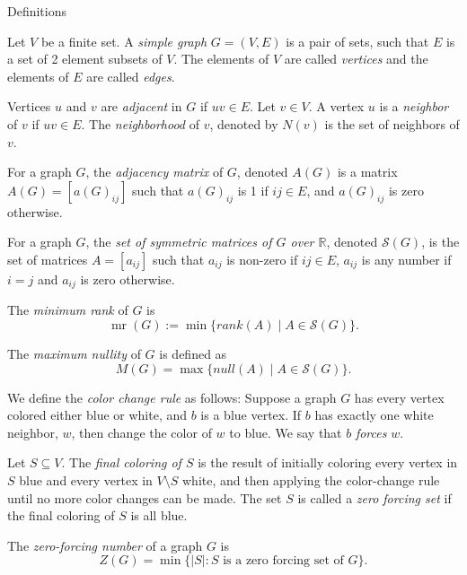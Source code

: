 \documentclass[final]{beamer}
\newcommand{\mr}{\operatorname{mr}}
\begin{document}
\begin{frame}{}
\begin{columns}[t]
\begin{column}{0.23\linewidth}
\begin{block}{Definitions}
\item Let $V$ be a finite set. A {\color{blue}\emph{simple graph}} $G=(V,E)$ is a pair of sets, such that $E$ is a set of 2 element subsets of $V$. The elements of $V$ are called {\color{blue}\emph{vertices}} and the elements of $E$ are called {\color{blue}\emph{edges}}. 
\item Vertices $u$ and $v$ are {\color{blue}\emph{adjacent}} in $G$ if $uv \in E$. Let $v \in V$. A vertex $u$ is a {\color{blue}\emph{neighbor}} of $v$ if $uv \in E$. The {\color{blue}\emph{neighborhood}} of $v$, denoted by $N(v)$ is the set of neighbors of $v$.
\item For a graph $G$, the {\color{blue}\emph{adjacency matrix}} of $G$, denoted $A(G)$ is a matrix $A(G) = [a(G)_{ij}]$ such that $a(G)_{ij}$ is 1 if $ij \in E$, and $a(G)_{ij}$ is zero otherwise. 
\item For a graph $G$, the {\color{blue}\emph{set of symmetric matrices of $G$ over $\mathbb{R}$}}, denoted $\mathcal{S}(G)$,  is the set of matrices $A=[a_{ij}]$ such that $a_{ij}$ is non-zero if $ij\in E$, $a_{ij}$ is any number if $i=j$ and $a_{ij}$ is zero otherwise. 
\item The {\color{blue}\emph{minimum rank}} of $G$ is 
\[
\mr(G) := \min\{rank(A) \mid A \in \mathcal{S}(G)\}.
\]
\item The {\color{blue}\emph{maximum nullity}} of $G$ is defined as 
\[
M(G) = \max\{null(A) \mid A \in \mathcal{S}(G)\}.
\]
\item We define the {\color{blue}\emph{color change rule}} as follows: Suppose a graph $G$ has every vertex colored either blue or white, and $b$ is a blue vertex. If $b$ has exactly one white neighbor, $w$, then change the color of $w$ to blue. We say that $b$ {\color{blue}\emph{forces }}$w$.
\item Let $S \subseteq V$. The {\color{blue}\emph{final coloring of $S$}} is
	the result of initially coloring every vertex in $S$ blue and every
	vertex in $V \setminus S$ white, and then applying the color-change
	rule until no more color changes can be made. The set $S$ is called a
	{\color{blue}\emph{zero forcing set}} if the final coloring of $S$ is all blue. 
\item The {\color{blue}\emph{zero-forcing number}} of a graph $G$ is 
\[
Z(G) = \min\{|S| : S\text{ is a zero forcing set of }G\}.
\] 


\end{block}
\end{column}
\end{columns}
\end{frame}
\end{document}
